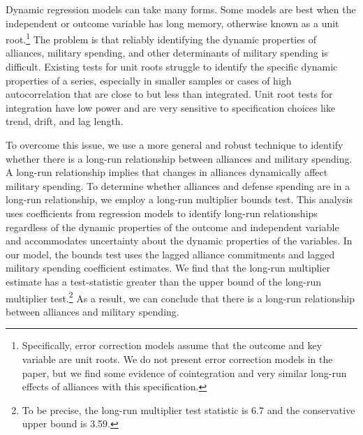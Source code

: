 \documentclass[12pt,hidelinks]{article}
\begin{document}
Dynamic regression models can take many forms. 
Some models are best when the independent or outcome variable has long memory, otherwise known as a unit root.\footnote{Specifically, error correction models assume that the outcome and key variable are unit roots. We do not present error correction models in the paper, but we find some evidence of cointegration and very similar long-run effects of alliances with this specification.} 
The problem is that reliably identifying the dynamic properties of alliances, military spending, and other determinants of military spending is difficult. 
Existing tests for unit roots struggle to identify the specific dynamic properties of a series, especially in smaller samples or cases of high autocorrelation that are close to but less than integrated. 
Unit root tests for integration have low power and are very sensitive to specification choices like trend, drift, and lag length.\autocite{Webbetal2019}


To overcome this issue, we use a more general and robust technique to identify whether there is a long-run relationship between alliances and military spending. 
A long-run relationship implies that changes in alliances dynamically affect military spending. 
To determine whether alliances and defense spending are in a long-run relationship, we employ a long-run multiplier bounds test.\autocite{Webbetal2020} 
This analysis uses coefficients from regression models to identify long-run relationships regardless of the dynamic properties of the outcome and independent variable and accommodates uncertainty about the dynamic properties of the variables. 
In our model, the bounds test uses the lagged alliance commitments and lagged military spending coefficient estimates. 
We find that the long-run multiplier estimate has a test-statistic greater than the upper bound of the long-run multiplier test.\footnote{To be precise, the long-run multiplier test statistic is 6.7 and the conservative upper bound is 3.59.} 
As a result, we can conclude that there is a long-run relationship between alliances and military spending.\autocite[293]{Webbetal2019} 
\end{document}
